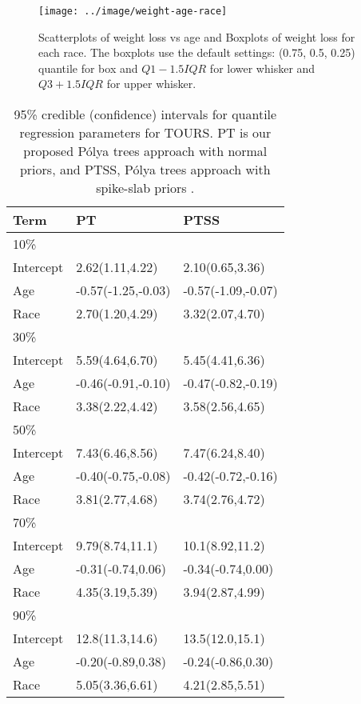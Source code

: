 \documentclass[12pt]{article}
\newcommand{\polya}{P\'{o}lya}
\begin{document}
\begin{figure}[htbp]
  \centerline{\texttt{[image: ../image/weight-age-race]}}
  \caption[]{\label{ch2:fig:tours} Scatterplots of weight loss vs age and
    Boxplots of weight loss for each race.  The boxplots use the
    default settings: (0.75, 0.5, 0.25) quantile for box and
    $Q1-1.5IQR$ for lower whisker and $Q3+1.5IQR$ for upper whisker. }
\end{figure}

\begin{table}[h]
  \caption[]{\label{ch2:tab:tours} 95\% credible (confidence) intervals for
    quantile regression parameters for TOURS.
    PT is our proposed \polya{} trees approach with normal priors, and PTSS,
    \polya{} trees approach with spike-slab priors .}
  \vspace{4mm}

  \centering
  \begin{tabular}[tb]{l|l|l}
    \toprule
    Term      & PT                 & PTSS               \\
    \hline
    10\%      &                    &                    \\
    Intercept & 2.62(1.11,4.22)    & 2.10(0.65,3.36)    \\
    Age       & -0.57(-1.25,-0.03) & -0.57(-1.09,-0.07) \\
    Race      & 2.70(1.20,4.29)    & 3.32(2.07,4.70)    \\
    \hline
    30\%      &                    &                    \\
    Intercept & 5.59(4.64,6.70)    & 5.45(4.41,6.36)    \\
    Age       & -0.46(-0.91,-0.10) & -0.47(-0.82,-0.19) \\
    Race      & 3.38(2.22,4.42)    & 3.58(2.56,4.65)    \\
    \hline
    50\%      &                    &                    \\
    Intercept & 7.43(6.46,8.56)    & 7.47(6.24,8.40)    \\
    Age       & -0.40(-0.75,-0.08) & -0.42(-0.72,-0.16) \\
    Race      & 3.81(2.77,4.68)    & 3.74(2.76,4.72)    \\
    \hline
    70\%      &                    &                    \\
    Intercept & 9.79(8.74,11.1)    & 10.1(8.92,11.2)    \\
    Age       & -0.31(-0.74,0.06)  & -0.34(-0.74,0.00)  \\
    Race      & 4.35(3.19,5.39)    & 3.94(2.87,4.99)    \\
    \hline
    90\%      &                    &                    \\
    Intercept & 12.8(11.3,14.6)    & 13.5(12.0,15.1)    \\
    Age       & -0.20(-0.89,0.38)  & -0.24(-0.86,0.30)  \\
    Race      & 5.05(3.36,6.61)    & 4.21(2.85,5.51)    \\
    \bottomrule
  \end{tabular}
\end{table}
\end{document}
